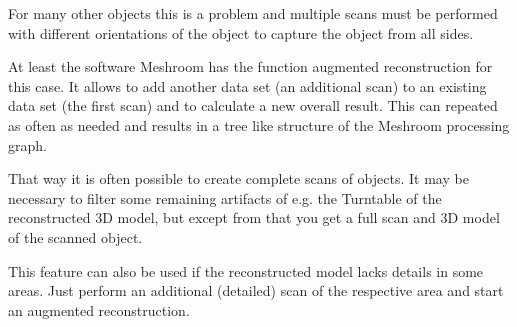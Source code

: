 For many other objects this is a problem and multiple scans must be performed with different orientations of the object to capture the object from all sides.%

At least the software Meshroom has the function augmented reconstruction for this case. It allows to add another data set (an additional scan) to an existing data set (the first scan) and to calculate a new overall result. This can repeated as often as needed and results in a tree like structure of the Meshroom processing graph.%

That way it is often possible to create complete scans of objects. It may be necessary to filter some remaining artifacts of e.g. the Turntable of the reconstructed 3D model, but except from that you get a full scan and 3D model of the scanned object.%

This feature can also be used if the reconstructed model lacks details in some areas. Just perform an additional (detailed) scan of the respective area and start an augmented reconstruction.%